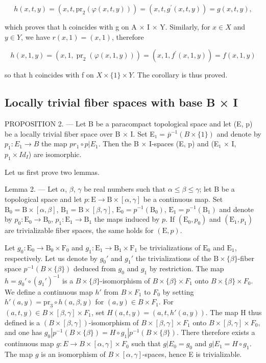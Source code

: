 \[
h (x, t, y) = (x, t, \mathrm{pr} _ {2} (\varphi (x, t, y))) = (x, t, g ^ {\prime} (x, t, y)) = g (x, t, y),
\]

which proves that h coincides with g on A × I × Y. Similarly, for \(x \in X\) and \(y \in Y\), we have \(r(x,1) = (x,1)\), therefore

\[
h (x, 1, y) = (x, 1, \operatorname{pr} _ {2} (\varphi (x, 1, y))) = (x, 1, f ^ {\prime} (x, 1, y)) = f (x, 1, y)
\]

so that h coincides with f on \(X \times \{1\} \times Y\). The corollary is thus proved.

\subsection{Locally trivial fiber spaces with base B × I}

PROPOSITION 2. --- Let B be a paracompact topological space and let (E, p) be a locally trivial fiber space over B × I. Set E₁ = \(\overline{p}^{-1}(B \times \{1\})\) and denote by \(p_{1}: E_{1} \to B\) the map \(pr_{1} \circ p | E_{1}\). Then the B × I-spaces (E, p) and (E₁ × I, \(p_{1} \times Id_{I}\)) are isomorphic.

Let us first prove two lemmas.

Lemma 2. --- Let \(\alpha\), \(\beta\), \(\gamma\) be real numbers such that \(\alpha \leqslant \beta \leqslant \gamma\); let B be a topological space and let \(p: \mathrm{E} \to \mathrm{B} \times [\alpha, \gamma]\) be a continuous map. Set \(\mathrm{B}_0 = \mathrm{B} \times [\alpha, \beta]\), \(\mathrm{B}_1 = \mathrm{B} \times [\beta, \gamma]\), \(\mathrm{E}_0 = p^{-1}(\mathrm{B}_0)\), \(\mathrm{E}_1 = p^{-1}(\mathrm{B}_1)\) and denote by \(p_0: \mathrm{E}_0 \to \mathrm{B}_0\), \(p_1: \mathrm{E}_1 \to \mathrm{B}_1\) the maps induced by \(p\). If \((\mathrm{E}_0, p_0)\) and \((\mathrm{E}_1, p_1)\) are trivializable fiber spaces, the same holds for \((\mathrm{E}, p)\).

Let \(g_0 \colon \mathrm{E}_0 \to \mathrm{B}_0 \times \mathrm{F}_0\) and \(g_1 \colon \mathrm{E}_1 \to \mathrm{B}_1 \times \mathrm{F}_1\) be trivializations of \(\mathrm{E}_0\) and \(\mathrm{E}_1\), respectively. Let us denote by \(g_0'\) and \(g_1'\) the trivializations of the \(\mathrm{B} \times \{\beta\}\)-fiber space \(p^{-1}(B \times \{\beta\})\) deduced from \(g_0\) and \(g_1\) by restriction. The map \(h = g_0' \circ (g_1')^{-1}\) is a \(B \times \{\beta\}\)-isomorphism of \(B \times \{\beta\} \times F_1\) onto \(B \times \{\beta\} \times F_0\). We define a continuous map \(h'\) from \(B \times F_1\) to \(F_0\) by setting \(h'(a, y) = \mathrm{pr}_3 \circ h(a, \beta, y)\) for \((a, y) \in B \times F_1\). For \((a, t, y) \in B \times [\beta, \gamma] \times F_1\), set \(H(a, t, y) = (a, t, h'(a, y))\). The map H thus defined is a \((B \times [\beta, \gamma])\)-isomorphism of \(B \times [\beta, \gamma] \times F_1\) onto \(B \times [\beta, \gamma] \times F_0\), and one has \(g_0 | p^{-1}(B \times \{\beta\}) = H \circ g_1 | p^{-1}(B \times \{\beta\})\). There therefore exists a continuous map \(g \colon E \to B \times [\alpha, \gamma] \times F_0\) such that \(g | E_0 = g_0\) and \(g | E_1 = H \circ g_1\). The map \(g\) is an isomorphism of \(B \times [\alpha, \gamma]\)-spaces, hence E is trivializable.

